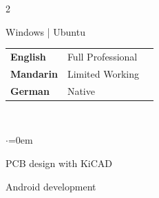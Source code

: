 \documentclass[grey]{hipstercv}
\newlength{\leftcolwidth}
\begin{document}
\begin{paracol}{2}
{\begin{minipage}[t]{0.3\textwidth}
\bigskip

\color{labelcolour}{OS:} \hspace{0.5em} \hspace{0.5em}Windows |  \hspace{0.3em}Ubuntu 
 
\bigskip

\bigskip


\begin{tabular}{l | ll}
\textbf{English} & {\phantom{x}\footnotesize Full Professional} \\[0.2em]
\textbf{Mandarin} & {\phantom{x}\footnotesize Limited Working} \\[0.2em]
\textbf{German} & {\phantom{x}\footnotesize Native} \\
\end{tabular}

\bigskip

 \\

\begin{list}{$\cdot$}{\leftmargin=0em}\setlength{\itemsep}{0.0em} \vspace{-0.em}
    \item PCB design with KiCAD 
    \item Android development
\end{list}

\vspace{10em}
\vspace{5em}



    
\end{minipage}






}
\end{paracol}
\end{document}
